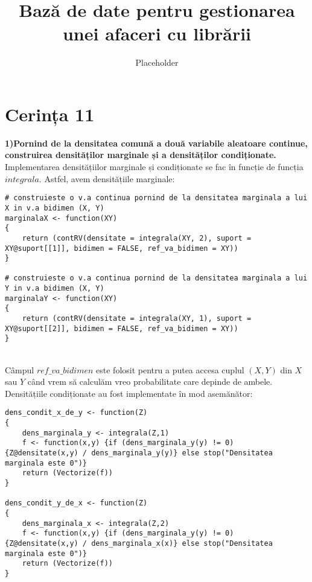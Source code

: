 \documentclass[12pt]{article}
\title{Bază de date pentru gestionarea unei afaceri cu librării}
\author{Placeholder}
\begin{document}
\section{Cerința 11}
\hfill \textbf{1)Pornind  de  la  densitatea  comună  a  două  variabile  aleatoare  continue,  construirea densităților marginale și a densităților condiționate.} \hfill \\
\indent Implementarea densitățiilor marginale și condiționate se fac în funcție de funcția $integrala$. Astfel, avem densitățiile marginale:
\begin{lstlisting}
# construieste o v.a continua pornind de la densitatea marginala a lui X in v.a bidimen (X, Y)
marginalaX <- function(XY)
{
	return (contRV(densitate = integrala(XY, 2), suport = XY@suport[[1]], bidimen = FALSE, ref_va_bidimen = XY))
}

# construieste o v.a continua pornind de la densitatea marginala a lui Y in v.a bidimen (X, Y)
marginalaY <- function(XY)
{
	return (contRV(densitate = integrala(XY, 1), suport = XY@suport[[2]], bidimen = FALSE, ref_va_bidimen = XY))
}
\end{lstlisting} \hfill \\
\indent Câmpul $ref\_va\_bidimen$ este folosit pentru a putea accesa cuplul $(X, Y)$ din $X$ sau $Y$ când vrem să calculăm vreo probabilitate care depinde de ambele. \\
\indent Densitățiile condiționate au fost implementate în mod asemănător:
\begin{lstlisting}
dens_condit_x_de_y <- function(Z)
{
	dens_marginala_y <- integrala(Z,1)
	f <- function(x,y) {if (dens_marginala_y(y) != 0) {Z@densitate(x,y) / dens_marginala_y(y)} else stop("Densitatea marginala este 0")}
	return (Vectorize(f))
}

dens_condit_y_de_x <- function(Z)
{
	dens_marginala_x <- integrala(Z,2)
	f <- function(x,y) {if (dens_marginala_y(y) != 0) {Z@densitate(x,y) / dens_marginala_x(x)} else stop("Densitatea marginala este 0")}
	return (Vectorize(f))
}
\end{lstlisting}
\end{document}
